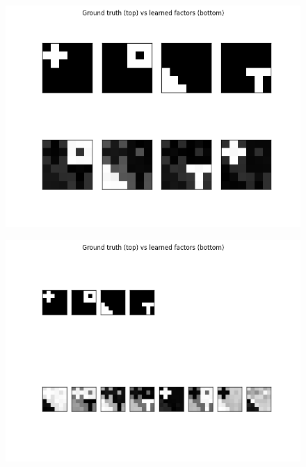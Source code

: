 \begin{figure}[!ht]
\centering
    \begin{minipage}{0.5\linewidth}
    \includegraphics[width=\linewidth]{PyIBP/example/PyIBP_comparison_best.png}
    \label{fig:PyIBPbest}
    \end{minipage}%
    \begin{minipage}{0.5\linewidth}
    \includegraphics[width=\linewidth]{PyIBP/example/PyIBP_comparison_worst.png}
    \label{fig:PyIBPworst}
    \end{minipage}
\end{figure}

